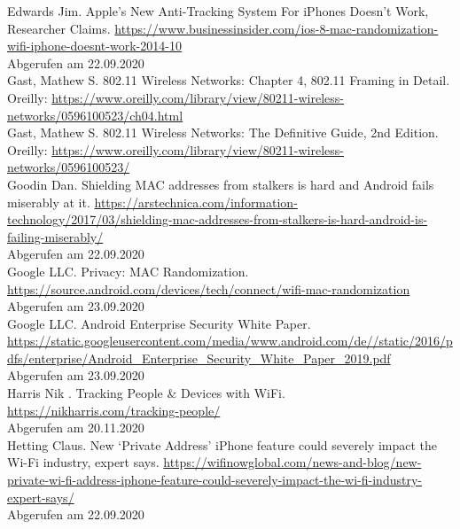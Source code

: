 \newline
Edwards Jim. Apple's New Anti-Tracking System For iPhones Doesn't Work, Researcher Claims.
\url{https://www.businessinsider.com/ios-8-mac-randomization-wifi-iphone-doesnt-work-2014-10} \\
Abgerufen am 22.09.2020 \\  
\clearpage 
Gast, Mathew S. 802.11 Wireless Networks: Chapter 4, 802.11 Framing in Detail.
Oreilly: \url{https://www.oreilly.com/library/view/80211-wireless-networks/0596100523/ch04.html} \\
\newline
Gast, Mathew S. 802.11 Wireless Networks: The Definitive Guide, 2nd Edition.
Oreilly: \url{https://www.oreilly.com/library/view/80211-wireless-networks/0596100523/} \\
\newline
Goodin Dan. Shielding MAC addresses from stalkers is hard and Android fails miserably at it.
\url{https://arstechnica.com/information-technology/2017/03/shielding-mac-addresses-from-stalkers-is-hard-android-is-failing-miserably/} \\
Abgerufen am 22.09.2020 \\ 
\newline
Google LLC. Privacy: MAC Randomization. \\
\url{https://source.android.com/devices/tech/connect/wifi-mac-randomization} \\
Abgerufen am 23.09.2020 \\ 
\newline
Google LLC. Android Enterprise Security White Paper. \\
\url{https://static.googleusercontent.com/media/www.android.com/de//static/2016/pdfs/enterprise/Android_Enterprise_Security_White_Paper_2019.pdf} \\
Abgerufen am 23.09.2020 \\
\newline
Harris Nik . Tracking People \& Devices with WiFi. \\
\url{https://nikharris.com/tracking-people/} \\
Abgerufen am 20.11.2020 \\
\newline
Hetting Claus. New ‘Private Address’ iPhone feature could severely impact the Wi-Fi industry, expert says.
\url{https://wifinowglobal.com/news-and-blog/new-private-wi-fi-address-iphone-feature-could-severely-impact-the-wi-fi-industry-expert-says/}\\
Abgerufen am 22.09.2020 \\
